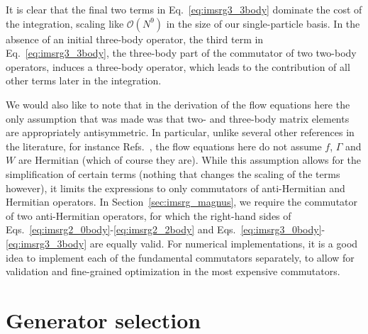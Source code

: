 It is clear that the final two terms in Eq.~\ref{eq:imsrg3_3body}
dominate the cost of the integration,
scaling like $\mathcal{O}(N^9)$ in the size of our single-particle basis.
In the absence of an initial three-body operator,
the third term in Eq.~\ref{eq:imsrg3_3body},
the three-body part of the commutator of two two-body operators,
induces a three-body operator,
which leads to the contribution of all other terms later in the integration.

We would also like to note that
in the derivation of the flow equations here
the only assumption that was made was that
two- and three-body matrix elements are appropriately antisymmetric.
In particular, unlike several other references in the literature,
for instance Refs.~\cite{Herg15imsrgphysrep,Tsuk10imsrg},
the flow equations here do not assume $f$, $\Gamma$ and $W$ are Hermitian
(which of course they are).
While this assumption allows for the simplification of certain terms
(nothing that changes the scaling of the terms however),
it limits the expressions to only commutators of anti-Hermitian and Hermitian operators.
In Section~\ref{sec:imsrg_magnus},
we require the commutator of two anti-Hermitian operators,
for which the right-hand sides of
Eqs.~\ref{eq:imsrg2_0body}-\ref{eq:imsrg2_2body}
and Eqs.~\ref{eq:imsrg3_0body}-\ref{eq:imsrg3_3body}
are equally valid.
For numerical implementations,
it is a good idea to implement each of the fundamental commutators separately,
to allow for validation and fine-grained optimization in the most expensive commutators.

\section{Generator selection}\label{sec:imsrg_generator}

